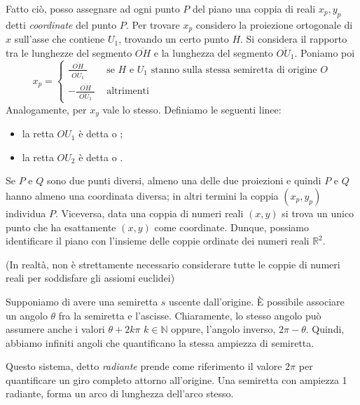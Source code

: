\documentclass[a4paper]{article}
\begin{document}
\DeclareRobustCommand{\widefrac}[3][5pt]{%
  \frac{\hspace{#1}#2\hspace{#1}}{\hspace{#1}#3\hspace{#1}}}

Fatto ciò, posso assegnare ad ogni punto \(P\) del piano una coppia di reali \(x_p, y_p\)
detti \textit{coordinate} del punto \(P\).
Per trovare \(x_p\) considero la proiezione ortogonale di \(x\) sull'asse che contiene \(U_1\),
trovando un certo punto \(H\). Si considera il rapporto tra le lunghezze del segmento \(\overline{OH}\)
e la lunghezza del segmento \(\overline{OU_1}\). Poniamo poi
\[
    x_p = \begin{cases}
        \widefrac{\overline{OH}}{\overline{OU_1}} & \text{ se } H \text{ e } U_1 \text{ stanno sulla stessa semiretta di origine } O \\
        -\widefrac{\overline{OH}}{\overline{OU_1}} & \text{ altrimenti}
    \end{cases}
\]
Analogamente, per \(x_y\) vale lo stesso.
Definiamo le seguenti linee:
\begin{itemize}
    \item la retta \(OU_1\) è detta  o ;
    \item la retta \(OU_2\) è detta  o .
\end{itemize}

Se \(P\) e \(Q\) sono due punti diversi, almeno una delle due proiezioni e quindi \(P\)
e \(Q\) hanno almeno una coordinata diversa; in altri termini la coppia \((x_p, y_p)\)
individua \(P\). Viceversa, data una coppia di numeri reali \((x,y)\) si trova
un unico punto che ha esattamente \((x,y)\) come coordinate.
Dunque, possiamo identificare il piano con l'insieme delle coppie ordinate dei numeri reali \({\mathbb{R}}^2\).

(In realtà, non è strettamente necessario considerare tutte le coppie di numeri reali
per soddisfare gli assiomi euclidei)

Supponiamo di avere una semiretta \(s\) uscente dall'origine.
È possibile associare un angolo \(\theta\) fra la semiretta e l'ascisse.
Chiaramente, lo stesso angolo può assumere anche i valori \(\theta +2k\pi\) \(k\in\mathbb{N}\) oppure,
l'angolo inverso, \(2\pi-\theta\). Quindi, abbiamo infiniti angoli che quantificano la stessa
ampiezza di semiretta.

Questo sistema, detto \textit{radiante}
prende come riferimento il valore \(2\pi\) per quantificare un giro completo attorno all'origine.
Una semiretta con ampiezza 1 radiante, forma un arco di lunghezza dell'arco stesso.
\end{document}
